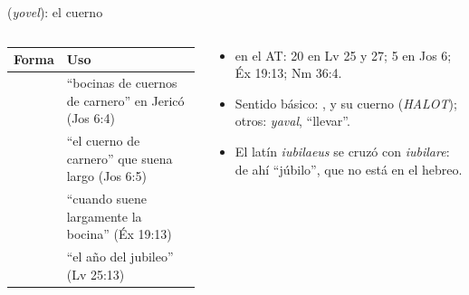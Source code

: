 \begin{frame}{ (\emph{yovel}): el cuerno}
\begin{columns}[t,onlytextwidth]
\begin{column}{0.54\textwidth}\scriptsize\renewcommand{\arraystretch}{1.15}
\begin{tabular}{@{}L{2.5cm}L{3.9cm}@{}}
\toprule
\textbf{Forma} & \textbf{Uso} \\ \midrule
{} & ``bocinas de cuernos de carnero'' en Jericó (Jos 6:4) \\
 & ``el cuerno de carnero'' que suena largo (Jos 6:5) \\
 & ``cuando suene largamente la bocina'' (Éx 19:13) \\
 & ``el año del jubileo'' (Lv 25:13) \\
\bottomrule
\end{tabular}
\end{column}
\begin{column}{0.44\textwidth}\small
\begin{itemize}
\item {} en el AT: 20 en Lv 25 y 27; 5 en Jos 6; Éx 19:13; Nm 36:4.
\item Sentido básico: , y su cuerno (\emph{HALOT}); otros: \emph{yaval}, ``llevar''.
\item El latín \emph{iubilaeus} se cruzó con \emph{iubilare}: de ahí ``júbilo'', que no está en el hebreo.
\end{itemize}
\par\justifying{}
\end{column}
\end{columns}
\end{frame}

